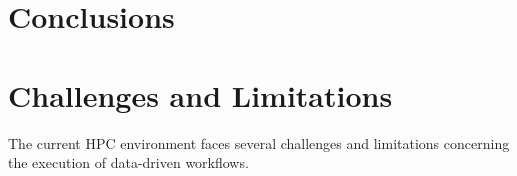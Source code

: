 \documentclass[a4paper]{article}
\begin{document}
{{{{}}

\section{Conclusions}
\label{sec:conclusions}



}}

\section{Challenges and Limitations}
\label{sec:challenges}
The current HPC environment faces several challenges and limitations concerning the execution of data-driven workflows.
\end{document}
